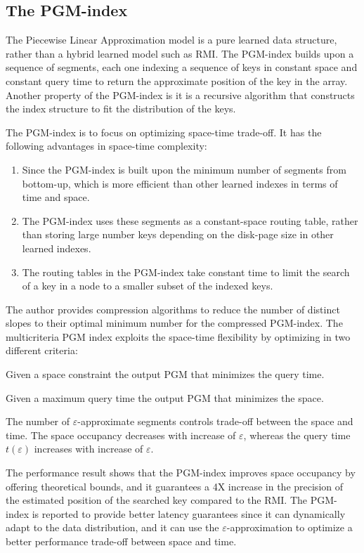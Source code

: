 \subsection{The PGM-index}
The Piecewise Linear Approximation model \cite{Ferragina:ud} is a pure learned data structure, rather than a hybrid learned model such as RMI. The PGM-index builds upon a sequence of segments, each one indexing a sequence of keys in constant space and constant query time to return the approximate position of the key in the array. Another property of the PGM-index is it is a recursive algorithm that constructs the index structure to fit the distribution of the keys. 

The PGM-index is to focus on optimizing space-time trade-off. It has the following advantages in space-time complexity:

\begin{enumerate}
    \item Since the PGM-index is built upon the minimum number of segments from bottom-up, which is more efficient than other learned indexes in terms of time and space. 
    \item The PGM-index uses these segments as a constant-space routing table, rather than storing large number keys depending on the disk-page size in other learned indexes. 
    \item The routing tables in the PGM-index take constant time to limit the search of a key in a node to a smaller subset of the indexed keys.
\end{enumerate}

 The author provides compression algorithms to reduce the number of distinct slopes to their optimal minimum number for the compressed PGM-index. The multicriteria PGM index exploits the space-time flexibility by optimizing in two different criteria: 
\begin{enumerate*}
  \item Given a space constraint the output PGM that minimizes the query time.
  \item Given a maximum query time the output PGM that minimizes the space.
\end{enumerate*}
The number of $\varepsilon$-approximate segments controls trade-off between the space and time. The space occupancy decreases with increase of $\varepsilon$, whereas the query time ${t(\varepsilon)}$ increases with increase of $\varepsilon$. 

The performance result shows that the PGM-index improves space occupancy by offering theoretical bounds, and it guarantees a 4X increase in the precision of the estimated position of the searched key compared to the RMI. The PGM-index is reported to provide better latency guarantees since it can dynamically adapt to the data distribution, and it can use the ${\varepsilon}$-approximation to optimize a better performance trade-off between space and time.


